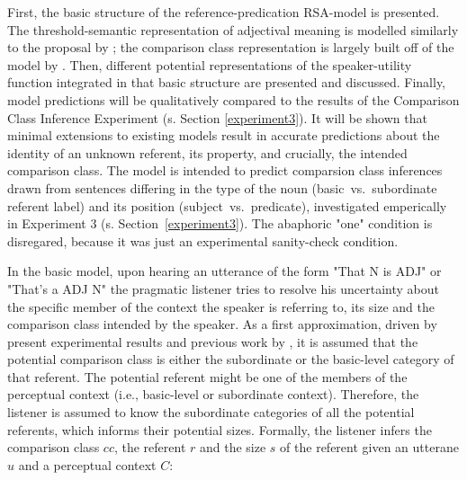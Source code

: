 First, the basic structure of the reference-predication RSA-model is presented. The threshold-semantic representation of adjectival meaning is modelled similarly to the proposal by \textcite{lassiter2013context}; the comparison class representation is largely built off of the model by \textcite{tessler2017warm}. Then, different potential representations of the speaker-utility function integrated in that basic structure are presented and discussed. Finally, model predictions will be qualitatively compared to the results of the Comparison Class Inference Experiment (s. Section \ref{experiment3}). It will be shown that minimal extensions to existing models result in accurate predictions about the identity of an unknown referent, its property, and crucially, the intended comparison class. 
The model is intended to predict comparsion class inferences drawn from sentences differing in the type of the noun (basic~vs.~subordinate referent label) and its position (subject~vs.~predicate), investigated emperically in Experiment 3 (s. Section~\ref{experiment3}). The abaphoric "one" condition is disregared, because it was just an experimental sanity-check condition. 

In the basic model, upon hearing an utterance of the form "That N is ADJ" or "That's a ADJ N" the pragmatic listener tries to resolve his uncertainty about the specific member of the context the speaker is referring to, its size and the comparison class intended by the speaker. As a first approximation, driven by present experimental results and previous work by \textcite{tessler2017warm}, it is assumed that the potential comparison class is either the subordinate or the basic-level category of that referent. The potential referent might be one of the members of the perceptual context (i.e., basic-level or subordinate context). Therefore, the listener is assumed to know the subordinate categories of all the potential referents, which informs their potential sizes.
Formally, the listener infers the comparison class $cc$, the referent $r$ and the size $s$ of the referent given an utterane $u$ and a perceptual context $C$:


